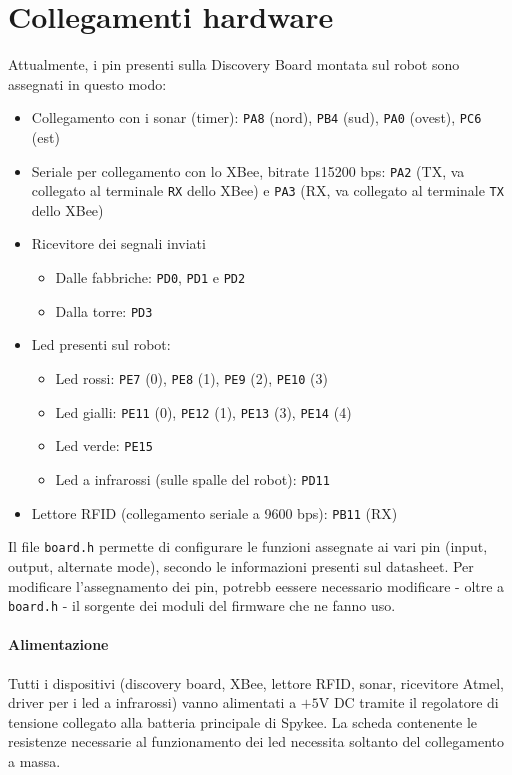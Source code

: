 \section{Collegamenti hardware}
Attualmente, i pin presenti sulla Discovery Board montata sul robot sono assegnati in questo modo:
\begin{itemize}
\item Collegamento con i sonar (timer): \verb|PA8| (nord), \verb|PB4| (sud), \verb|PA0| (ovest), \verb|PC6| (est)
\item Seriale per collegamento con lo XBee, bitrate 115200 bps: \verb|PA2| (TX, va collegato al terminale \verb|RX| dello XBee) e \verb|PA3| (RX, va collegato al terminale \verb|TX| dello XBee)
\item Ricevitore dei segnali inviati
	\begin{itemize}
	\item Dalle fabbriche: \verb|PD0|, \verb|PD1| e \verb|PD2|
	\item Dalla torre: \verb|PD3|
	\end{itemize}
\item Led presenti sul robot:
	\begin{itemize}
	\item Led rossi: \verb|PE7| (0), \verb|PE8| (1), \verb|PE9| (2), \verb|PE10| (3)
	\item Led gialli: \verb|PE11| (0), \verb|PE12| (1), \verb|PE13| (3), \verb|PE14| (4)
	\item Led verde: \verb|PE15|
	\item Led a infrarossi (sulle spalle del robot): \verb|PD11|
	\end{itemize}
\item Lettore RFID (collegamento seriale a 9600 bps): \verb|PB11| (RX)
\end{itemize}
\begin{nota}
Il file \verb|board.h| permette di configurare le funzioni assegnate ai vari pin (input, output, alternate mode), secondo le informazioni presenti sul datasheet. Per modificare l'assegnamento dei pin, potrebb eessere necessario modificare - oltre a \verb|board.h| - il sorgente dei moduli del firmware che ne fanno uso.
\end{nota}

\paragraph{Alimentazione} Tutti i dispositivi (discovery board, XBee, lettore RFID, sonar, ricevitore Atmel, driver per i led a infrarossi) vanno alimentati a $+5$V DC tramite il regolatore di tensione collegato alla batteria principale di Spykee. La scheda contenente le resistenze necessarie al funzionamento dei led necessita soltanto del collegamento a massa.

